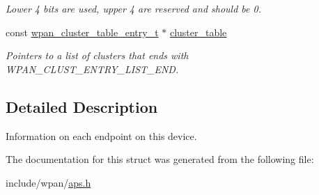 \begin{DoxyCompactItemize}
\begin{DoxyCompactList}\small\item\em Lower 4 bits are used, upper 4 are reserved and should be 0. \end{DoxyCompactList}\item 
const \hyperlink{structwpan__cluster__table__entry__t}{wpan\-\_\-cluster\-\_\-table\-\_\-entry\-\_\-t} $\ast$ \hyperlink{group__wpan__aps_gac7944498524739a9becec626bf9bcb15}{cluster\-\_\-table}
\begin{DoxyCompactList}\small\item\em Pointers to a list of clusters that ends with W\-P\-A\-N\-\_\-\-C\-L\-U\-S\-T\-\_\-\-E\-N\-T\-R\-Y\-\_\-\-L\-I\-S\-T\-\_\-\-E\-N\-D. \end{DoxyCompactList}\end{DoxyCompactItemize}


\subsection{Detailed Description}
Information on each endpoint on this device. 

The documentation for this struct was generated from the following file\-:\begin{DoxyCompactItemize}
\item 
include/wpan/\hyperlink{aps_8h}{aps.\-h}\end{DoxyCompactItemize}
